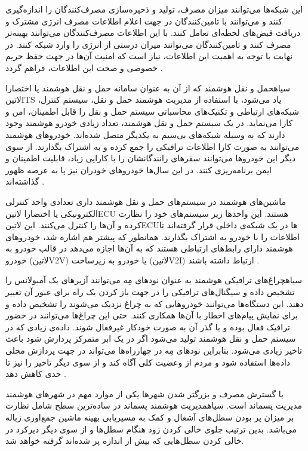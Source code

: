 این شبکه‌ها می‌توانند میزان مصرف، تولید و ذخیره‌سازی مصرف‌کنندگان را اندازه‌گیری کنند و می‌توانند با تامین‌کنندگان در جهت اعلام اطلاعات مصرف انرژی مشترک و دریافت قبض‌های لحظه‌ای تعامل کنند.
با این اطلاعات مصرف‌کنندگان می‌توانند بهینه‌تر مصرف کنند و تامین‌کنندگان می‌توانند میزان درستی از انرژی را وارد شبکه کنند.
در نهایت با توجه به اهمیت این اطلاعات، نیاز است که امنیت آن‌ها در جهت حفظ حریم خصوصی و صحت این اطلاعات، فراهم گردد
.


‌سیاه{حمل و نقل هوشمند} که از آن به عنوان سامانه حمل و نقل هوشمند یا اختصارا ‌لاتین{ITS} یاد می‌شود، با استفاده از مدیریت هوشمند حمل و نقل، سیستم کنترل، شبکه‌های ارتباطی و تکنیک‌های محاسباتی
سیستم حمل و نقل را قابل اطمینان، امن و کارا می‌نماید.
در یک سیستم حمل و نقل هوشمند، تعداد زیادی خودرو هوشمند وجود دارند که به وسیله شبکه‌های بی‌سیم به یکدیگر متصل شده‌اند. خودروهای هوشمند می‌توانند به صورت کارا اطلاعات ترافیکی را جمع کرده
و به اشتراک بگذارند. از سوی دیگر این خودروها می‌توانند سفر‌های رانندگانشان را با کارایی زیاد، قابلیت اطمینان و ایمن برنامه‌ریزی کنند. در این سال‌ها خودروهای خودران نیز پا به عرصه ظهور گذاشته‌اند
.

ماشین‌های هوشمند در سیستم‌های حمل و نقل هوشمند داری تعدادی واحد کنترلی الکترونیکی یا اختصارا ‌لاتین{ECU} هستند. این واحدها زیر سیستم‌های خود را نظارت کرده و آن‌ها را کنترل می‌کنند.
این ‌لاتین{ECU}ها در یک شبکه‌ی داخلی قرار گرفته‌اند تا اطلاعات را با خودرو به اشتراک بگذارند. همانطور که پیشتر هم اشاره شد، خودروهای هوشمند دارای رابط‌های ارتباطی هستند که به آن‌ها اجازه می‌دهد
در قالب خودرو به خودرو (‌لاتین{V2V}) یا خودرو به زیرساخت (‌لاتین{V2I}) ارتباط داشته باشند
.

‌سیاه{چراغ‌های ترافیکی} هوشمند به عنوان نودهای مِه می‌توانند آزیرهای یک آمبولانس را تشخیص داده و سیگنال‌های ترافیکی را در جهت باز کردن یک راه برای عبور آن تغییر دهند.
این دستگاه‌ها می‌توانند خودروهایی که به چراغ نزدیک می‌شوند را تشخیص داده و برای نمایش پیام‌های اخطار با آن‌ها همکاری کنند.
حتی این چراغ‌ها می‌توانند در حضور ترافیک فعال بوده و با گذر آن به صورت خودکار غیرفعال شوند.
داده‌ی زیادی که در سیستم حمل و نقل هوشمند تولید می‌شود اگر در یک ابر متمرکز پردازش شود باعث تاخیر زیادی می‌شود.
بنابراین نودهای مِه در چهارراه‌ها می‌تواند در جهت پردازش محلی داده‌ها استفاده شود و مردم از وعضیت کلی آگاه کند و از سوی دیگر تاخیر را نیز تا حدی کاهش دهد
.

با گسترش مصرف و بزرگتر شدن شهرها یکی از موارد مهم در شهرهای هوشمند مدیریت پسماند است. ‌سیاه{مدیریت هوشمند پسماند} در ساده‌ترین سطح شامل نظارت بر میزان پر بودن سطل‌های آشغال
و کمک به مسیریابی بهینه ماشین جمع‌اوری زباله می‌باشد. بدین ترتیب جلوی خالی کردن زود هنگام سطل‌ها و از سوی دیگر دیرکرد در خالی کردن سطل‌هایی که بیش از اندازه پر شده‌اند گرفته خواهد شد.

